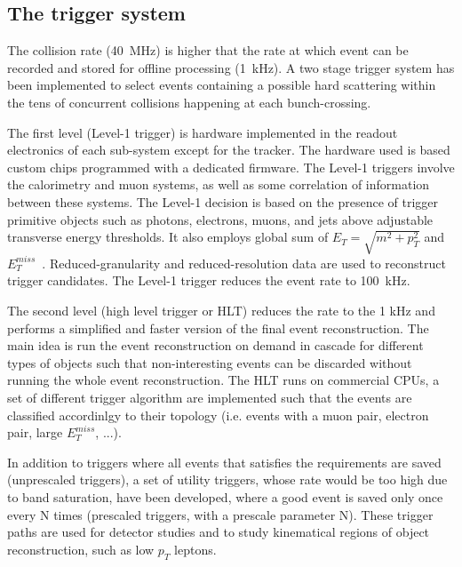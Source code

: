 \subsection{The trigger system}
The collision rate (40~MHz) is higher that the rate at which event can be recorded and stored for
offline processing (1~kHz). A two stage trigger system has been implemented to select events containing
a possible hard scattering within the tens of concurrent collisions happening at each bunch-crossing.

The first level (Level-1 trigger) is hardware  implemented in the readout electronics of each sub-system except for
the tracker. The hardware used is based custom chips programmed with a dedicated firmware.
The Level-1 triggers involve the calorimetry and muon systems, as well as some correlation
of information between these systems. The Level-1 decision is based on the presence of trigger
primitive objects such as photons, electrons, muons, and jets above adjustable transverse energy thresholds.
It also employs global sum of $E_T = \sqrt{m^2 + p_T^2}$ and $E_T^{miss}$~\cite{trigger}. Reduced-granularity and
reduced-resolution data are used to reconstruct trigger candidates.
The Level-1 trigger reduces the event rate to 100~kHz.

The second level (high level trigger or HLT) reduces the rate to the 1 kHz and performs a simplified and faster
version of the final event reconstruction. The main idea is run the event reconstruction on demand in cascade for
different types of objects such that non-interesting events can be discarded without running the whole
event reconstruction. The HLT runs on commercial CPUs, 
a set of different trigger algorithm are implemented such that the events are classified accordinlgy
to their topology (i.e. events with a muon pair, electron pair, large $E_T^{miss}$, ...).

In addition to triggers where all events that satisfies the requirements are saved (unprescaled
triggers), a set of utility triggers, whose rate would be too high due to band saturation, have
been developed, where a good event is saved only once every N times (prescaled triggers, with
a prescale parameter N). These trigger paths are used for detector studies and to study kinematical
regions of object reconstruction, such as low $p_T$ leptons.

